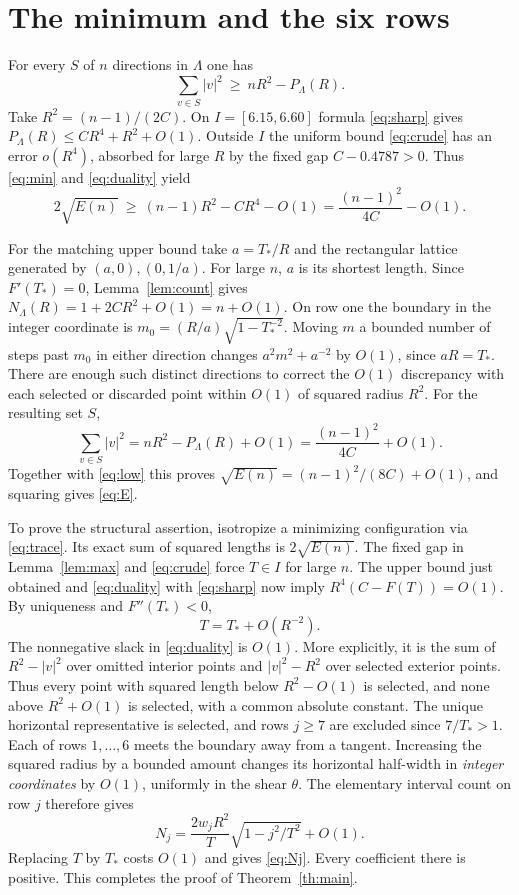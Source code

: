 \documentclass[11pt]{article}
\newcommand{\tp}{T_{\!*}}\newcommand{\rank}{\operatorname{rank}}
\begin{document}
\section{The minimum and the six rows}
For every $S$ of $n$ directions in $\Lambda$ one has
\begin{equation}
 \sum_{v\in S}|v|^2\ \ge\ nR^2-P_\Lambda(R).
 \label{eq:duality}
\end{equation}
Take $R^2=(n-1)/(2C)$. On $I=[6.15,6.60]$ formula \eqref{eq:sharp} gives $P_\Lambda(R)\le CR^4+R^2+O(1)$. Outside $I$ the uniform bound \eqref{eq:crude} has an error $o(R^4)$, absorbed for large $R$ by the fixed gap $C-0.4787>0$. Thus \eqref{eq:min} and \eqref{eq:duality} yield
\begin{equation}
 2\sqrt{E(n)}\ \ge\ (n-1)R^2-CR^4-O(1)
       =\frac{(n-1)^2}{4C}-O(1). \label{eq:low}
\end{equation}

For the matching upper bound take $a=\tp/R$ and the rectangular lattice generated by $(a,0),(0,1/a)$. For large $n$, $a$ is its shortest length. Since $F'(\tp)=0$, Lemma~\ref{lem:count} gives $N_\Lambda(R)=1+2CR^2+O(1)=n+O(1)$. On row one the boundary in the integer coordinate is $m_0=(R/a)\sqrt{1-\tp^{-2}}$. Moving $m$ a bounded number of steps past $m_0$ in either direction changes $a^2m^2+a^{-2}$ by $O(1)$, since $aR=\tp$. There are enough such distinct directions to correct the $O(1)$ discrepancy with each selected or discarded point within $O(1)$ of squared radius $R^2$. For the resulting set $S$,
\[
 \sum_{v\in S}|v|^2=nR^2-P_\Lambda(R)+O(1)
                  =\frac{(n-1)^2}{4C}+O(1).
\]
Together with \eqref{eq:low} this proves $\sqrt{E(n)}=(n-1)^2/(8C)+O(1)$, and squaring gives \eqref{eq:E}.

To prove the structural assertion, isotropize a minimizing configuration via \eqref{eq:trace}. Its exact sum of squared lengths is $2\sqrt{E(n)}$. The fixed gap in Lemma~\ref{lem:max} and \eqref{eq:crude} force $T\in I$ for large $n$. The upper bound just obtained and \eqref{eq:duality} with \eqref{eq:sharp} now imply $R^4(C-F(T))=O(1)$. By uniqueness and $F''(\tp)<0$,
\begin{equation}
                    T=\tp+O(R^{-2}).
\end{equation}
The nonnegative slack in \eqref{eq:duality} is $O(1)$. More explicitly, it is the sum of $R^2-|v|^2$ over omitted interior points and $|v|^2-R^2$ over selected exterior points. Thus every point with squared length below $R^2-O(1)$ is selected, and none above $R^2+O(1)$ is selected, with a common absolute constant. The unique horizontal representative is selected, and rows $j\ge7$ are excluded since $7/\tp>1$. Each of rows $1,\ldots,6$ meets the boundary away from a tangent. Increasing the squared radius by a bounded amount changes its horizontal half-width in \emph{integer coordinates} by $O(1)$, uniformly in the shear $\theta$. The elementary interval count on row $j$ therefore gives
\[
 N_j=\frac{2w_jR^2}{T}\sqrt{1-j^2/T^2}+O(1).
\]
Replacing $T$ by $\tp$ costs $O(1)$ and gives \eqref{eq:Nj}. Every coefficient there is positive. This completes the proof of Theorem~\ref{th:main}.
\end{document}
